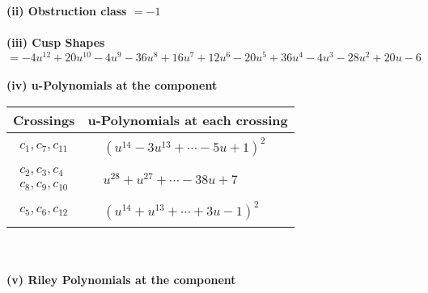 \documentclass[1p]{elsarticle_modified}
\theoremstyle{definition}
\begin{document}
\flushleft \textbf{(ii) Obstruction class $= -1$}\\~\\
\flushleft \textbf{(iii) Cusp Shapes $= -4 u^{12}+20 u^{10}-4 u^9-36 u^8+16 u^7+12 u^6-20 u^5+36 u^4-4 u^3-28 u^2+20 u-6$}\\~\\
\newpage\renewcommand{\arraystretch}{1}
\flushleft \textbf{(iv) u-Polynomials at the component}\newline \\
\begin{tabular}{m{50pt}|m{274pt}}
Crossings & \hspace{64pt}u-Polynomials at each crossing \\
\hline $$\begin{aligned}c_{1},c_{7},c_{11}\end{aligned}$$&$\begin{aligned}
&(u^{14}-3 u^{13}+\cdots-5 u+1)^{2}
\end{aligned}$\\
\hline $$\begin{aligned}c_{2},c_{3},c_{4}\\c_{8},c_{9},c_{10}\end{aligned}$$&$\begin{aligned}
&u^{28}+u^{27}+\cdots-38 u+7
\end{aligned}$\\
\hline $$\begin{aligned}c_{5},c_{6},c_{12}\end{aligned}$$&$\begin{aligned}
&(u^{14}+u^{13}+\cdots+3 u-1)^{2}
\end{aligned}$\\
\hline
\end{tabular}\\~\\
\newpage\renewcommand{\arraystretch}{1}
\flushleft \textbf{(v) Riley Polynomials at the component}\newline \\
\end{document}
